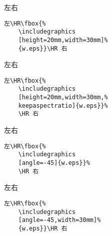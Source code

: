 \begin{minipage}[c]{.45\textwidth}
	左\HR{}\HR 右
\end{minipage}%
\hspace{-.5cm}\begin{minipage}[c]{.5\textwidth}
	\begin{Verbatim}[frame=lines,label=\colorbox{green}{\small 例三},labelposition=topline]
	左\HR\fbox{%
	\includegraphics
	[height=20mm,width=30mm]%
	{w.eps}}\HR 右
	\end{Verbatim}
\end{minipage}

\begin{minipage}[c]{.45\textwidth}
	左\HR\fbox{%
		\texttt{[image: w]}}\HR 右
\end{minipage}%
\hspace{-.5cm}\begin{minipage}[c]{.5\textwidth}
	\begin{Verbatim}[frame=lines,label=\colorbox{green}{\small 例四},labelposition=topline]
	左\HR\fbox{%
	\includegraphics
	[height=20mm,width=30mm,%
	keepaspectratio]{w.eps}}%
	\HR 右
	\end{Verbatim}
\end{minipage}

\begin{minipage}[c]{.45\textwidth}
	左\HR\fbox{%
		\texttt{[image: w]}}\HR 右
\end{minipage}%
\hspace{-.5cm}\begin{minipage}[c]{.5\textwidth}
	\begin{Verbatim}[frame=lines,label=\colorbox{green}{\small 例五},labelposition=topline]
	左\HR\fbox{%
	\includegraphics
	[angle=-45]{w.eps}}%
	\HR 右
	\end{Verbatim}
\end{minipage}

\begin{minipage}[c]{.45\textwidth}
	左\HR{}\HR 右
\end{minipage}%
\hspace{-.5cm}\begin{minipage}[c]{.5\textwidth}
	\begin{Verbatim}[frame=lines,label=\colorbox{green}{\small 例六},labelposition=topline]
	左\HR\fbox{%
	\includegraphics
	[angle=-45,width=30mm]%
	{w.eps}}\HR 右
	\end{Verbatim}
\end{minipage}

